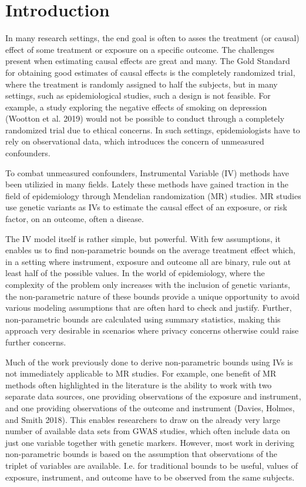 \documentclass[
]{article}
\author{}
\date{\vspace{-2.5em}}
\theoremstyle{plain}
\begin{document}
{
\setcounter{tocdepth}{2}
\tableofcontents
}
\newpage

\hypertarget{introduction}{%
\section{Introduction}\label{introduction}}

In many research settings, the end goal is often to asses the treatment (or causal) effect of some treatment or exposure on a specific outcome. The challenges present when estimating causal effects are great and many. The Gold Standard for obtaining good estimates of causal effects is the completely randomized trial, where the treatment is randomly assigned to half the subjects, but in many settings, such as epidemiological studies, such a design is not feasible. For example, a study exploring the negative effects of smoking on depression (Wootton et al. 2019) would not be possible to conduct through a completely randomized trial due to ethical concerns. In such settings, epidemiologists have to rely on observational data, which introduces the concern of unmeasured confounders.

To combat unmeasured confounders, Instrumental Variable (IV) methods have been utilizied in many fields. Lately these methods have gained traction in the field of epidemiology through Mendelian randomization (MR) studies. MR studies use genetic variants as IVs to estimate the causal effect of an exposure, or risk factor, on an outcome, often a disease.

The IV model itself is rather simple, but powerful. With few assumptions, it enables us to find non-parametric bounds on the average treatment effect which, in a setting where instrument, exposure and outcome all are binary, rule out at least half of the possible values. In the world of epidemiology, where the complexity of the problem only increases with the inclusion of genetic variants, the non-parametric nature of these bounds provide a unique opportunity to avoid various modeling assumptions that are often hard to check and justify. Further, non-parametric bounds are calculated using summary statistics, making this approach very desirable in scenarios where privacy concerns otherwise could raise further concerns.

Much of the work previously done to derive non-parametric bounds using IVs is not immediately applicable to MR studies. For example, one benefit of MR methods often highlighted in the literature is the ability to work with two separate data sources, one providing observations of the exposure and instrument, and one providing observations of the outcome and instrument (Davies, Holmes, and Smith 2018). This enables researchers to draw on the already very large number of available data sets from GWAS studies, which often include data on just one variable together with genetic markers. However, most work in deriving non-parametric bounds is based on the assumption that observations of the triplet of variables are available. I.e. for traditional bounds to be useful, values of exposure, instrument, and outcome have to be observed from the same subjects.
\end{document}
